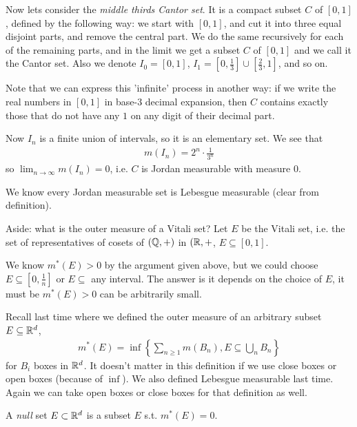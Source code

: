 \documentclass[a4paper]{article}
\begin{document}
Now lets consider the \emph{middle thirds Cantor set}. It is a compact subset $C$ of $[0,1]$, defined by the following way: we start with $[0,1]$, and cut it into three equal disjoint parts, and remove the central part. We do the same recursively for each of the remaining parts, and in the limit we get a subset $C$ of $[0,1]$ and we call it the Cantor set. Also we denote $I_0=[0,1]$, $I_1=[0,\frac{1}{3}]\cup[\frac{2}{3},1]$, and so on.

Note that we can express this 'infinite' process in another way: if we write the real numbers in $[0,1]$ in base-3 decimal expansion, then $C$ contains exactly those that do not have any $1$ on any digit of their decimal part.

Now $I_n$ is a finite union of intervals, so it is an elementary set. We see that
\begin{equation*}
\begin{aligned}
m(I_n) = 2^n \cdot \frac{1}{3^n}
\end{aligned}
\end{equation*}
so $\lim_{n \to \infty} m(I_n) = 0$, i.e. $C$ is Jordan measurable with measure $0$.

We know every Jordan measurable set is Lebesgue measurable (clear from definition).

Aside: what is the outer measure of a Vitali set? Let $E$ be the Vitali set, i.e. the set of representatives of cosets of $(\mathbb{Q},+)$ in $(\mathbb{R},+$, $E \subseteq [0,1]$.

We know $m^*(E)>0$ by the argument given above, but we could choose $E \subseteq [0,\frac{1}{n}]$ or $E \subseteq$ any interval. The answer is it depends on the choice of $E$, it must be $m^*(E)>0$ can be arbitrarily small.

Recall last time where we defined the outer measure of an arbitrary subset $E \subseteq \mathbb{R}^d$,
\begin{equation*}
\begin{aligned}
m^*(E) = \inf \left\{ \sum_{n \geq 1} m(B_n), E \subseteq \bigcup_n B_n\right\}
\end{aligned}
\end{equation*}
for $B_i$ boxes in $\mathbb{R}^d$. It doesn't matter in this definition if we use close boxes or open boxes (because of $\inf$). We also defined Lebesgue measurable last time. Again we can take open boxes or close boxes for that definition as well.

\begin{defi}
A \emph{null} set $E \subset \mathbb{R}^d$ is a subset $E$ s.t. $m^*(E)=0$.
\end{defi}
\end{document}
